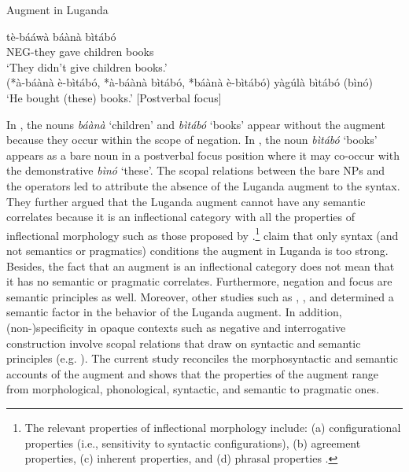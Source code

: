 \documentclass[output=paper]{langscibook}
\begin{document}
\begin{exe}
\ex Augment in Luganda\label{hayagusii4}
\begin{xlist}
\ex\label{hayagusii4a} \gll	tè-bááwà               báànà    bìtábó \\
            NEG-they gave    children    books \\
      \trans     ‘They didn’t give children books.’\\
           (*à-báànà  è-bìtábó, *à-báànà  bìtábó, *báànà  è-bìtábó)
\ex\label{hayagusii4b} 	yàgúlà  bìtábó  (bìnó) \\
        ‘He bought (these) books.’  [Postverbal focus]
\end{xlist}
\end{exe}
In , the nouns \textit{báànà} ‘children’ and \textit{bìtábó} ‘books’ appear without the augment because they occur within the scope of negation. In , the noun \textit{bìtábó} ‘books’ appears as a bare noun in a postverbal focus position where it may co-occur with the demonstrative \textit{bìnó} ‘these’. The scopal relations between the bare NPs and the operators led \citet{hyman1993augment} to attribute the absence of the Luganda augment to the syntax. They further argued that the Luganda augment cannot have any semantic correlates because it is an inflectional category with all the properties of inflectional morphology such as those proposed by \citet{anderson1988inflection}.\footnote{The relevant properties of inflectional morphology include: (a) configurational properties (i.e., sensitivity to syntactic configurations), (b) agreement properties, (c) inherent properties, and (d) phrasal properties \citep{anderson1988inflection}.} \citet{hyman1993augment} claim that only syntax (and not semantics or pragmatics) conditions the augment in Luganda is too strong. Besides, the fact that an augment is an inflectional category does not mean that it has no semantic or pragmatic correlates. Furthermore, negation and focus are semantic principles as well. Moreover, other studies such as \citet[30]{ashton1987luganda}, \citet{mould1974syntax}, and \citet{ferrari2009} determined a semantic factor in the behavior of the Luganda augment. In addition, (non-)specificity in opaque contexts such as negative and interrogative construction involve scopal relations that draw on syntactic and semantic principles (e.g. \citealt{abusch1993scope,lyons1999definiteness,winter1997choice}). The current study reconciles the morphosyntactic and semantic accounts of the augment and shows that the properties of the augment range from morphological, phonological, syntactic, and semantic to pragmatic ones.
\end{document}
